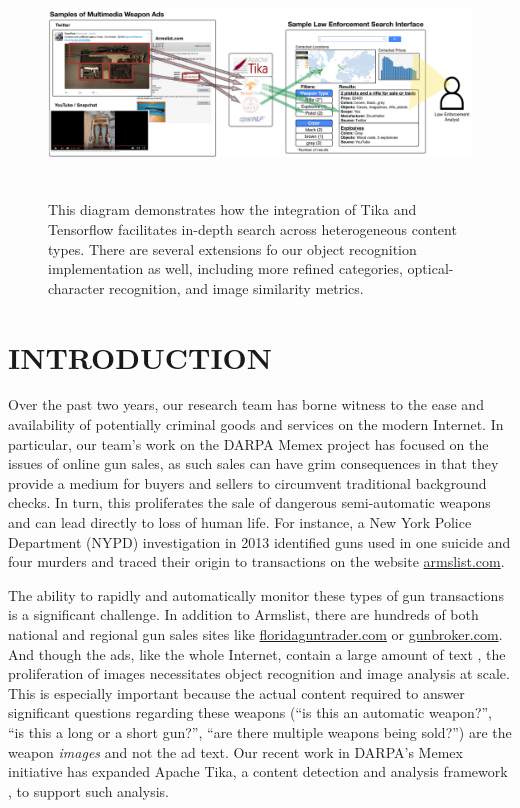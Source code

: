 \begin{figure}[!t]
  \centering
        \includegraphics[width=\textwidth,height=6cm]{interface-diagram}
        \caption{This diagram demonstrates how the integration of Tika and Tensorflow facilitates in-depth search across heterogeneous content types. There are several extensions fo our object recognition implementation as well, including more refined categories, optical-character recognition, and image similarity metrics.}
        \label{fig:interface-diagram}
\end{figure}
\section{INTRODUCTION}
Over the past two years, our research team has borne witness to the ease and availability of potentially criminal goods and services on the modern Internet. In particular, our team's work on the DARPA Memex project has focused on the issues of online gun sales, as such sales can have grim consequences in that they provide a medium for buyers and sellers to circumvent traditional background checks. In turn, this proliferates the sale of dangerous semi-automatic weapons and can lead directly to loss of human life. For instance, a New York Police Department (NYPD) investigation in 2013 identified guns used in one suicide and four murders and traced their origin to transactions on the website \url{armslist.com}\cite{raja_2016}. 

The ability to rapidly and automatically monitor these types of gun transactions is a significant challenge. In addition to Armslist, there are hundreds of both national and regional gun sales sites like \url{floridaguntrader.com} or \url{gunbroker.com}. And though the ads, like the whole Internet, contain a large amount of text \cite{mphillips-EOT2012}, the proliferation of images necessitates object recognition and image analysis at scale. This is especially important because the actual content required to answer significant questions regarding these weapons (``is this an automatic weapon?'', ``is this a long or a short gun?'', ``are there multiple weapons being sold?'') are the weapon {\em images} and not the ad text. Our recent work in DARPA's Memex initiative has expanded Apache Tika, a content detection and analysis framework \cite{mattmann2011tika}, to support such analysis.


